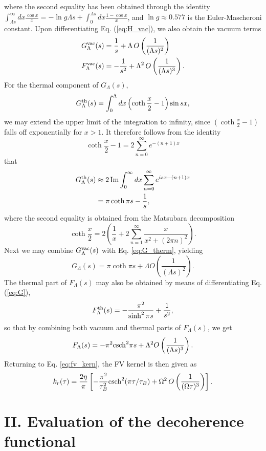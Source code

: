 \documentclass[prl,twocolumn,superscriptaddress,amsmath,amssymb]{revtex4-2}
\def\be{\begin{equation}}
\def\ee{\end{equation}}
\newcommand{\csh}{{\rm csch}}
\begin{document}
where the second equality has been obtained through the identity $\int^{\infty}_{\Lambda s}dx\frac{\cos x}{x} = -\ln g\Lambda s + \int^{\Lambda s}_0dx\frac{1-\cos x}{x}$, and $\ln g\approx 0.577$ is the Euler-Mascheroni constant. Upon differentiating Eq. (\ref{eq:H_vac}), we also obtain the vacuum terms
\begin{align}
	G^{\rm vac}_{\Lambda}(s) &= \frac{1}{s} + \Lambda \,O\left(\frac{1}{(\Lambda s)^2}\right) \\
	F^{\rm vac}_{\Lambda}(s) &=  -\frac{1}{s^2} + \Lambda^2\,O\left(\frac{1}{(\Lambda s)^3}\right).
\end{align}
For the thermal component of $G_{\Lambda}(s)$,
\be
	G^{\rm th}_{\Lambda}(s) = \int^{\Lambda}_0dx\left(\coth\frac{x}{2} -1\right)\sin sx,
\ee
we may extend the upper limit of the integration to infinity, since $(\coth\frac{x}{2}-1)$ falls off exponentially for $x>1$. It therefore follows from the identity
\[
	\coth\frac{x}{2} -1 = 2\sum^{\infty}_{n=0}e^{-(n+1)x}
\]
that
\begin{align}\label{eq:G_therm}
	G^{\rm th}_{\Lambda}(s) &\approx 2\,{\rm Im}\int^{\infty}_0dx\sum^{\infty}_{n=0}e^{isx - (n+1)x} \nonumber\\
    &= \pi\coth \pi s - \frac{1}{s},
\end{align}
where the second equality is obtained from the Matsubara decomposition
\[
	\coth\frac{x}{2} = 2\left(\frac{1}{x} + 2\sum^{\infty}_{n=1}\frac{x}{x^2+(2\pi n)^2}\right).
\]
Next we may combine $G^{\rm vac}_{\Lambda}(s)$ with Eq. \eqref{eq:G_therm}, yielding
\be\label{eq:G}
	G_{\Lambda}(s) = \pi\coth\pi s + \Lambda O\left(\frac{1}{(\Lambda s)^2}\right).
\ee
The thermal part of $F_{\Lambda}(s)$ may also be obtained by means of differentiating Eq. (\ref{eq:G}),
\be
	F^{\rm th}_{\Lambda}(s) = -\frac{\pi^2}{\sinh^2\pi s} + \frac{1}{s^2},
\ee
so that by combining both vacuum and thermal parts of $F_{\Lambda}(s)$, we get
\be\label{eq:FL}
	F_{\Lambda}(s) = -\pi^2\csh^2\pi s + \Lambda^2O\left(\frac{1}{(\Lambda s)^3}\right).
\ee
Returning to Eq. \eqref{eq:fv_kern}, the FV kernel is then given as
\be
	k_r(\tau) =  \frac{2\eta}{\pi}\left[-\frac{\pi^2}{\tau_B^2}\csh^2(\pi \tau/\tau_B) + \Omega^2\,O\left(\frac{1}{(\Omega \tau)^3}\right)\right].
\ee


\section{II. Evaluation of the decoherence functional}\label{sec:functional}
\end{document}
